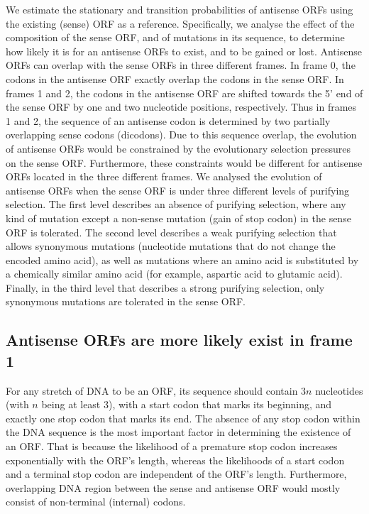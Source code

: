 \documentclass[12pt,a4paper]{article}
\begin{document}
We estimate the stationary and transition probabilities of antisense ORFs using the existing (sense) ORF as a reference. Specifically, we analyse the effect of the composition of the sense ORF, and of mutations in its sequence, to determine how likely it is for an antisense ORFs to exist, and to be gained or lost. Antisense ORFs can overlap with the sense ORFs in three different frames. In frame 0, the codons in the antisense ORF exactly overlap the codons in the sense ORF. In frames 1 and 2, the codons in the antisense ORF are shifted towards the 5' end of the sense ORF by one and two nucleotide positions, respectively. Thus in frames 1 and 2, the sequence of an antisense codon is determined by two partially overlapping sense codons (dicodons). Due to this sequence overlap, the evolution of antisense ORFs would be constrained by the evolutionary selection pressures on the sense ORF. Furthermore, these constraints would be different for antisense ORFs located in the three different frames. We analysed the evolution of antisense ORFs when the sense ORF is under three different levels of purifying selection. The first level describes an absence of purifying selection, where any kind of mutation except a non-sense mutation (gain of stop codon) in the sense ORF is tolerated. The second level describes a weak purifying selection that allows synonymous mutations (nucleotide mutations that do not change the encoded amino acid), as well as mutations where an amino acid is substituted by a chemically similar amino acid (for example, aspartic acid to glutamic acid). Finally, in the third level that describes a strong purifying selection, only synonymous mutations are tolerated in the sense ORF.

\subsection*{Antisense ORFs are more likely exist in frame 1}

For any stretch of DNA to be an ORF, its sequence should contain 3$n$ nucleotides (with $n$ being at least 3), with a start codon that marks its beginning, and exactly one stop codon that marks its end. The absence of any stop codon within the DNA sequence is the most important factor in determining the existence of an ORF. That is because the likelihood of a premature stop codon increases exponentially with the ORF's length, whereas the likelihoods of a start codon and a terminal stop codon are independent of the ORF's length. Furthermore, overlapping DNA region between the sense and antisense ORF would mostly consist of non-terminal (internal) codons. 
\end{document}
